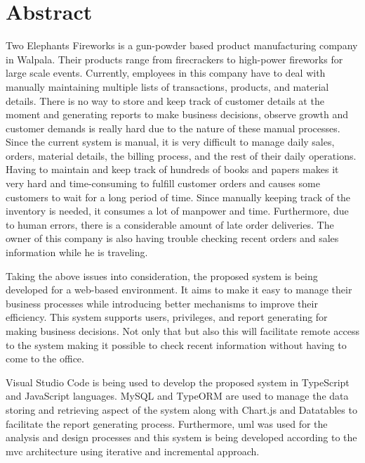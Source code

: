 \documentclass[12pt]{report}
\begin{document}
\noindent
{}

\newpage
\thispagestyle{plain}
\chapter*{\Huge Abstract}
Two Elephants Fireworks is a gun-powder based product manufacturing company in Walpala. Their products range from firecrackers to high-power fireworks for large scale events. Currently, employees in this company have to deal with manually maintaining multiple lists of transactions, products, and material details. There is no way to store and keep track of customer details at the moment and generating reports to make business decisions, observe growth and customer demands is really hard due to the nature of these manual processes.
Since the current system is manual, it is very difficult to manage daily sales, orders, material details, the billing process, and the rest of their daily operations. Having to maintain and keep track of hundreds of books and papers makes it very hard and time-consuming to fulfill customer orders and causes some customers to wait for a long period of time. Since manually keeping track of the inventory is needed, it consumes a lot of manpower and time. Furthermore, due to human errors, there is a considerable amount of late order deliveries. The owner of this company is also having trouble checking recent orders and sales information while he is traveling.

Taking the above issues into consideration, the proposed system is being developed for a web-based environment. It aims to make it easy to manage their business processes while introducing better mechanisms to improve their efficiency. This system supports users, privileges, and report generating for making business decisions. Not only that but also this will facilitate remote access to the system making it possible to check recent information without having to come to the office.

Visual Studio Code is being used to develop the proposed system in TypeScript and JavaScript languages. MySQL and TypeORM are used to manage the data storing and retrieving aspect of the system along with Chart.js and Datatables to facilitate the report generating process. Furthermore, \acrlong{uml} was used for the analysis and design processes and this system is being developed according to the \acrshort{mvc} architecture using iterative and incremental approach.
\end{document}
